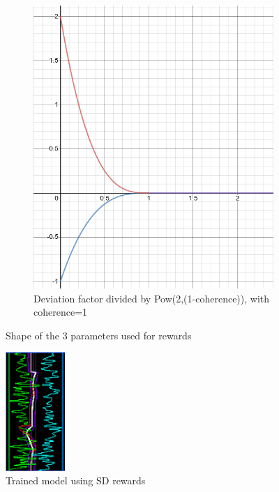 \begin{figure}
\begin{subfigure}[b]{0.3\textwidth}
        \includegraphics[width=\textwidth]{img/stdDevfactor.png}
        \caption{Deviation factor divided by Pow(2,(1-coherence)), with coherence=1}
        \label{fig:devf}
    \end{subfigure}
    \caption{Shape of the 3 parameters used for rewards}
		\label{fig:stdshapes}
\end{figure}

\begin{figure}
    \centering
    \includegraphics[width=0.2\textwidth]{img/graphsSTDrew.png}
		\caption{Trained model using SD rewards}
		\label{fig:stdrewards}
\end{figure}

